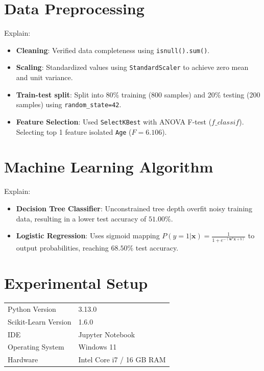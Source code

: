 \documentclass[12pt,a4paper]{article}
\begin{document}
\section{Data Preprocessing}

Explain:
\begin{itemize}
\item \textbf{Cleaning}: Verified data completeness using \texttt{isnull().sum()}.
\item \textbf{Scaling}: Standardized values using \texttt{StandardScaler} to achieve zero mean and unit variance.
\item \textbf{Train-test split}: Split into 80\% training (800 samples) and 20\% testing (200 samples) using \texttt{random\_state=42}.
\item \textbf{Feature Selection}: Used \texttt{SelectKBest} with ANOVA F-test ($f\_classif$). Selecting top 1 feature isolated \texttt{Age} ($F=6.106$).
\end{itemize}

\section{Machine Learning Algorithm}

Explain:
\begin{itemize}
\item \textbf{Decision Tree Classifier}: Unconstrained tree depth overfit noisy training data, resulting in a lower test accuracy of $51.00\%$.
\item \textbf{Logistic Regression}: Uses sigmoid mapping $P(y=1|\mathbf{x}) = \frac{1}{1 + e^{-(\mathbf{w}^T \mathbf{x} + b)}}$ to output probabilities, reaching $68.50\%$ test accuracy.
\end{itemize}

\section{Experimental Setup}

\begin{tabular}{ll}
\toprule
Python Version & 3.13.0 \\
Scikit-Learn Version & 1.6.0 \\
IDE & Jupyter Notebook \\
Operating System & Windows 11 \\
Hardware & Intel Core i7 / 16 GB RAM \\
\bottomrule
\end{tabular}
\end{document}
